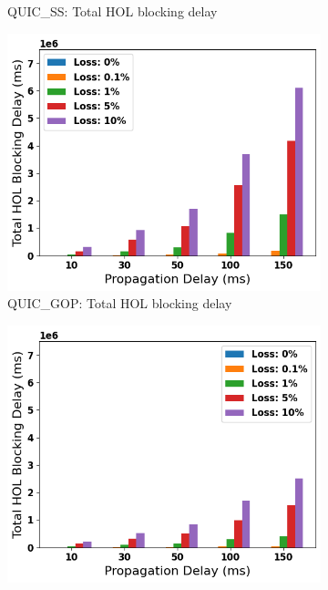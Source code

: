 \documentclass{mpaper}
\begin{document}
\begin{figure}
\begin{subfigure}[b]{0.32\textwidth}
      \caption{QUIC\_SS: Total HOL blocking delay}
      \label{fig:SS_HOL_TOTAL}
  \end{subfigure}
  \hfill
  \begin{subfigure}[b]{0.32\textwidth}
      \centering
      \includegraphics[width=\textwidth]{Total_HOL_Blocking/QUIC_GOP_Total_HOL_delay.png}
      \caption{QUIC\_GOP: Total HOL blocking delay}
      \label{fig:GOP_HOL_TOTAL}
  \end{subfigure}
  \begin{subfigure}[b]{0.32\textwidth}
      \centering
      \includegraphics[width=\textwidth]{Total_HOL_Blocking/QUIC_FPS_Total_HOL_delay.png}

\end{subfigure}
\end{figure}
\end{document}
